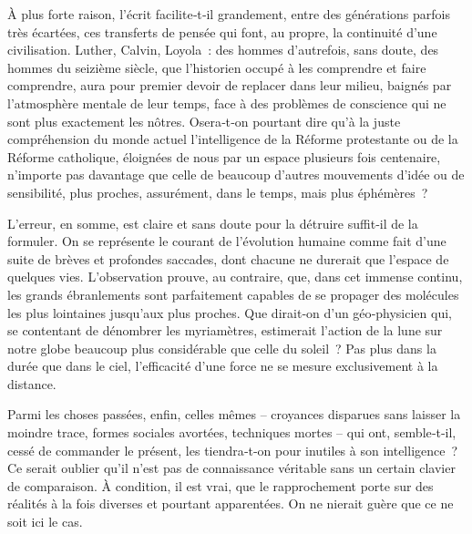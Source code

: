 \documentclass[french,twoside]{book} %
\newcommand{\astermono}{\medskip\centerline{\color{rubric}\large\selectfont{\syms ✻}}\medskip\par}%
\begin{document}
\astermono

\noindent À plus forte raison, l’écrit facilite‑t‑il grandement, entre des géné­rations parfois très écartées, ces transferts de pensée qui font, au propre, la continuité d’une civilisation. Luther, Calvin, Loyola : des hommes d’autrefois, sans doute, des hommes du seizième siècle, que l’historien occupé à les comprendre et faire comprendre, aura pour premier devoir de replacer dans leur milieu, baignés par l’atmosphère mentale de leur temps, face à des problèmes de conscience qui ne sont plus exactement les nôtres. Osera‑t‑on pourtant dire qu’à la juste compréhension du monde actuel l’intelligence de la Réforme protestante ou de la Réforme catholique, éloignées de nous par un espace plusieurs fois centenaire, n’importe pas davantage que celle de beaucoup d’autres mouvements d’idée ou de sensibilité, plus proches, assurément, dans le temps, mais plus éphémères ?\par
L’erreur, en somme, est claire et sans doute pour la détruire suffit‑il de la formuler. On se représente le courant de l’évolution humaine comme fait d’une suite de brèves et profondes saccades, dont chacune ne durerait que l’espace de quelques vies. L’observation prouve, au contraire, que, dans cet immense continu, les grands ébranlements sont parfaitement capables de se propager des molécules les plus lointaines jusqu’aux plus proches. Que dirait‑on d’un géo‑physicien qui, se contentant de dénom­brer les myriamètres, estimerait l’action de la lune sur notre globe beau­coup plus considérable que celle du soleil ? Pas plus dans la durée que dans le ciel, l’efficacité d’une force ne se mesure exclusivement à la distance.\par
\bigbreak
\noindent  {}
\label{p13} Parmi les choses passées, enfin, celles mêmes – croyances disparues sans laisser la moindre trace, formes sociales avortées, techniques mortes – qui ont, semble‑t‑il, cessé de commander le présent, les tiendra‑t‑on pour inutiles à son intelligence ? Ce serait oublier qu’il n’est pas de con­naissance véritable sans un certain clavier de comparaison. À condition, il est vrai, que le rapprochement porte sur des réalités à la fois diverses et pourtant apparentées. On ne nierait guère que ce ne soit ici le cas.\par
\end{document}
